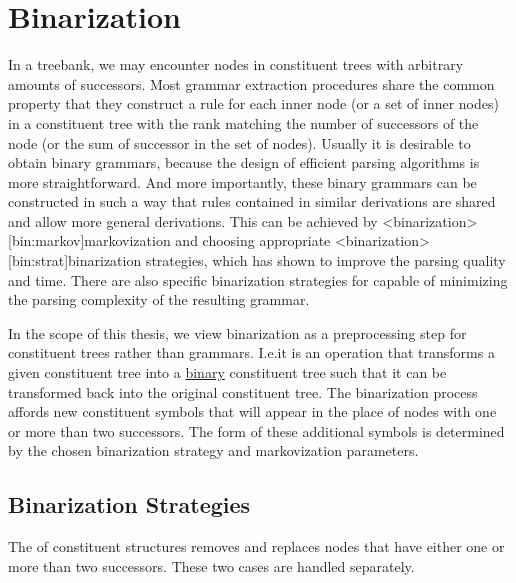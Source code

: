 \documentclass[../document.tex]{subfiles}
\begin{document}
    \section{Binarization} 
    In a treebank, we may encounter nodes in constituent trees with arbitrary amounts of successors.
    Most grammar extraction procedures share the common property that they construct a rule for each inner node (or a set of inner nodes) in a constituent tree with the rank matching the number of successors of the node (or the sum of successor in the set of nodes).
    Usually it is desirable to obtain binary grammars, because the design of efficient parsing algorithms is more straightforward.
    And more importantly, these binary grammars can be constructed in such a way that rules contained in similar derivations are shared and allow more general derivations.
    This can be achieved by <binarization>[bin:markov]{markovization} and choosing appropriate <binarization>[bin:strat]{binarization strategies}, which has shown to improve the parsing quality and time. \citep{Son08,Cra12}
    There are also specific binarization strategies for  capable of minimizing the parsing complexity of the resulting grammar. \citep{Gil10}

    In the scope of this thesis, we view binarization as a preprocessing step for constituent trees rather than grammars.
    I.e.\@ it is an operation that transforms a given constituent tree into a \hyperlink{binctree}{binary} constituent tree such that it can be transformed back into the original constituent tree.
    The binarization process affords new constituent symbols that will appear in the place of nodes with one or more than two successors.
    The form of these additional symbols is determined by the chosen binarization strategy and markovization parameters.

    \subsection{Binarization Strategies}
    The  of constituent structures removes and replaces nodes that have either one or more than two successors.
    These two cases are handled separately.
\end{document}
